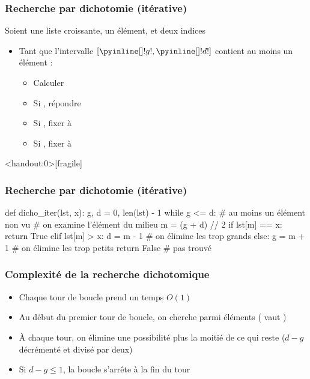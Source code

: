 \documentclass[12pt]{linfo-beamer}
\begin{document}
\begin{frame}
  \frametitle{Recherche par dichotomie (itérative)}

  Soient  une liste croissante,  un élément,
   et  deux indices

  \vfill

  \begin{itemize}
  \item Tant que l'intervalle $[\code{g}, \code{d}]$ contient au moins
    un élément :
    \begin{itemize}
    \item Calculer 
    \item Si , répondre 
    \item Si , fixer  à 
    \item Si , fixer  à 
    \end{itemize}
  \end{itemize}

\end{frame}


\begin{frame}<handout:0>[fragile]
\frametitle{Recherche par dichotomie (itérative)}

\small
\begin{pyframe}{}
def dicho_iter(lst, x):
    g, d = 0, len(lst) - 1
    while g <= d:  # au moins un élément non vu
        # on examine l'élément du milieu
        m = (g + d) // 2
        if lst[m] == x:
            return True
        elif lst[m] > x:
            d = m - 1  # on élimine les trop grands
        else:
            g = m + 1  # on élimine les trop petits
    return False  # pas trouvé
\end{pyframe}
\end{frame}


\begin{frame}
  \frametitle{Complexité de la recherche dichotomique}

  \begin{itemize}
  \item Chaque tour de boucle prend un temps $O(1)$
  \item Au début du premier tour de boucle, on cherche parmi  éléments ( vaut )
  \item À chaque tour, on élimine une possibilité plus la moitié de ce qui reste ($d-g$ décrémenté et divisé par deux)
  \item Si $d-g \leq 1$, la boucle s'arrête à la fin du tour


  \end{itemize}
\end{frame}
\end{document}
